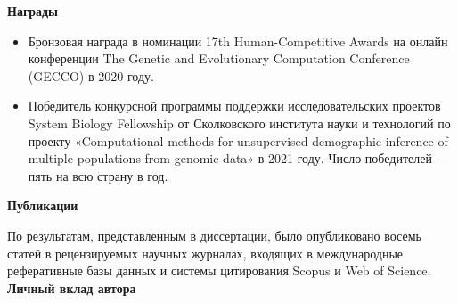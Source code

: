\textbf{Награды} 
\begin{itemize}
    \item Бронзовая награда в номинации 17th Human-Competitive Awards на онлайн конференции The Genetic and Evolutionary Computation Conference (GECCO) в 2020 году.
    \item Победитель конкурсной программы поддержки исследовательских проектов System Biology Fellowship от Сколковского института науки и технологий по проекту «Computational methods for unsupervised demographic inference of multiple populations from genomic data» в 2021 году. Число победителей --- пять на всю страну в год.\\
\end{itemize}

\textbf{Публикации}

По результатам, представленным в диссертации, было опубликовано восемь статей в рецензируемых научных журналах, входящих в международные реферативные базы данных и системы цитирования Scopus и Web of Science.\\


\textbf{Личный вклад автора}

